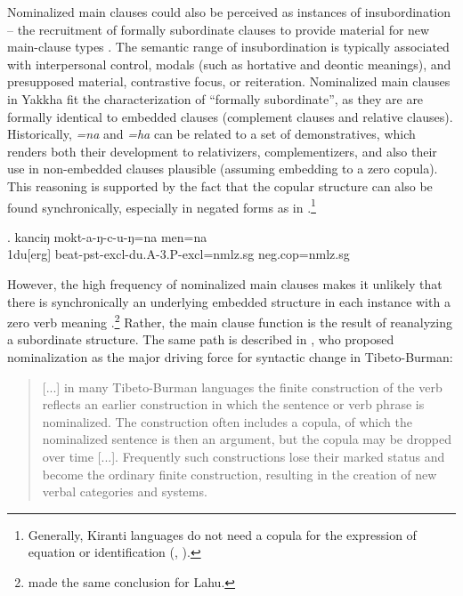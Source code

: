 Nominalized main clauses could also be perceived as instances of insubordination – the  recruitment of formally subordinate clauses to provide material for new main-clause types \citep{Evans2007_Insubordination}. The semantic range of insubordination is typically associated with interpersonal control, modals (such as hortative and deontic meanings), and presupposed material, contrastive focus, or reiteration. Nominalized main clauses in Yakkha fit the characterization of “formally subordinate”, as they are are formally identical to embedded clauses (complement clauses and relative clauses). 
Historically,   \emph{=na} and \emph{=ha} can be related to a set of demonstratives, which renders both their development to relativizers, complementizers, and also their use in  non-embedded  clauses plausible (assuming embedding to a zero copula). This reasoning is supported by the fact that the copular structure can also be found synchronically, especially in negated forms as in \Next.\footnote{Generally,  Kiranti languages do not need a copula for the expression of equation or identification (\citet[276]{Bickel1999Nominalization}, \citet[105]{Ebert1994The-structure}).}  

 \exg. kanciŋ  mokt-a-ŋ-c-u-ŋ=na  men=na\\
{\sc 1du[erg]} beat{\sc -pst-excl-du.A-3.P-excl=nmlz.sg} {\sc neg.cop=nmlz.sg}\\
  
 

However, the high frequency of nominalized main clauses makes it unlikely that there is synchronically an underlying embedded structure in each instance with a zero verb meaning .\footnote{\citet{Matisoff1972Lahu} made the same conclusion for Lahu.} Rather, the main clause function is the result of reanalyzing a subordinate structure. The same path is described in \citet{DeLancey2011_Finite}, who proposed nominalization as the major driving force for syntactic change in Tibeto-Burman:\\
 
\begin{quote} 
[...] in many Tibeto-Burman languages the finite construction of the verb reflects an earlier construction in which the sentence or verb phrase is nominalized. The construction  often  includes  a  copula,  of  which  the  nominalized  sentence  is  then  an argument, but the copula may be dropped over time [...]. Frequently  such  constructions  lose  their marked  status  and  become  the  ordinary  finite  construction,  resulting  in  the creation  of  new  verbal  categories  and  systems. \citep[343]{DeLancey2011_Finite}
\end{quote}
 
